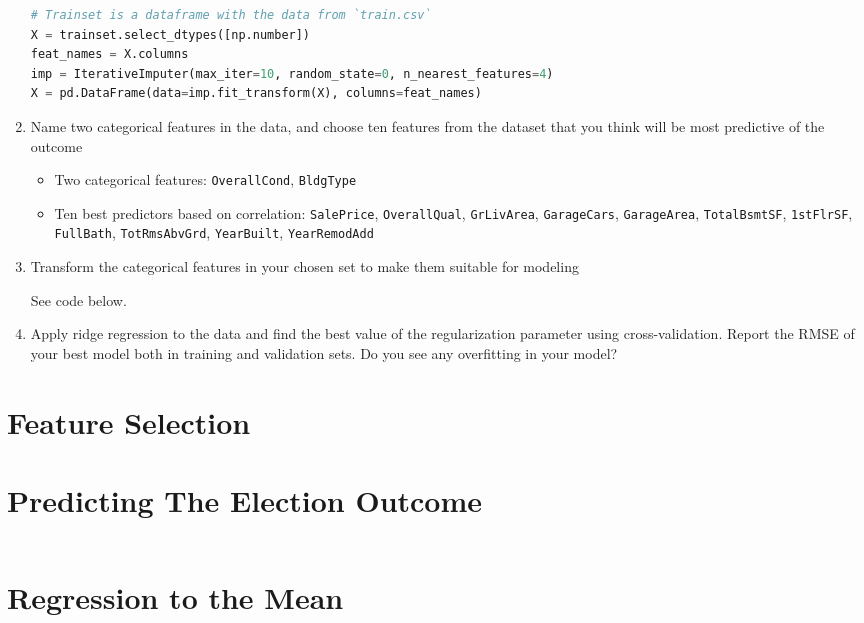 \documentclass{article}
\begin{document}
\begin{enumerate}[label={(\alph*)}]
\begin{lstlisting}[language=Python, caption=Imputing missing values using
\texttt{IterativeImputer}]
# Trainset is a dataframe with the data from `train.csv`
X = trainset.select_dtypes([np.number])
feat_names = X.columns
imp = IterativeImputer(max_iter=10, random_state=0, n_nearest_features=4)
X = pd.DataFrame(data=imp.fit_transform(X), columns=feat_names)
\end{lstlisting}
    
    \item Name two categorical features in the data, and choose ten features from
    the dataset that you think will be most predictive of the outcome
    \begin{itemize}
        \item Two categorical features: \texttt{OverallCond}, \texttt{BldgType}
        \item Ten best predictors based on correlation: \texttt{SalePrice}, 
        \texttt{OverallQual}, \texttt{GrLivArea}, \texttt{GarageCars}, 
        \texttt{GarageArea}, \texttt{TotalBsmtSF}, \texttt{1stFlrSF},
        \texttt{FullBath}, \texttt{TotRmsAbvGrd}, \texttt{YearBuilt}, 
        \texttt{YearRemodAdd}
    \end{itemize}
    
    \item Transform the categorical features in your chosen set to make them
    suitable for modeling
    
    See code below.
    
    \item Apply ridge regression to the data and find the best value of the 
    regularization parameter using cross-validation. Report the RMSE of your best 
    model both in training and validation sets. Do you see any overfitting in your 
    model?


\end{enumerate}
\pagebreak

\section{Feature Selection}
\pagebreak

\section{Predicting The Election Outcome}
\begin{lstlisting}[language=Python, caption=Code for Question 1 \emph{Hypothesis
Testing}]

\end{lstlisting}

\pagebreak

\section{Regression to the Mean}

%
%
\end{document}
